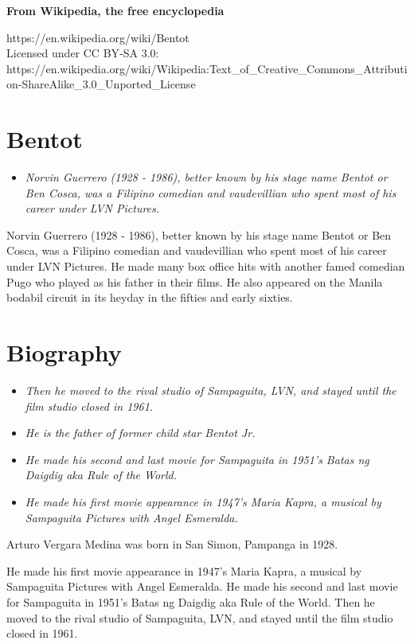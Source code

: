 \textbf{From Wikipedia, the free encyclopedia}

https://en.wikipedia.org/wiki/Bentot\\
Licensed under CC BY-SA 3.0:\\
https://en.wikipedia.org/wiki/Wikipedia:Text\_of\_Creative\_Commons\_Attribution-ShareAlike\_3.0\_Unported\_License

\section{Bentot}\label{bentot}

\begin{itemize}
\item
  \emph{Norvin Guerrero (1928 - 1986), better known by his stage name
  Bentot or Ben Cosca, was a Filipino comedian and vaudevillian who
  spent most of his career under LVN Pictures.}
\end{itemize}

Norvin Guerrero (1928 - 1986), better known by his stage name Bentot or
Ben Cosca, was a Filipino comedian and vaudevillian who spent most of
his career under LVN Pictures. He made many box office hits with another
famed comedian Pugo who played as his father in their films. He also
appeared on the Manila bodabil circuit in its heyday in the fifties and
early sixties.

\section{Biography}\label{biography}

\begin{itemize}
\item
  \emph{Then he moved to the rival studio of Sampaguita, LVN, and stayed
  until the film studio closed in 1961.}
\item
  \emph{He is the father of former child star Bentot Jr.}
\item
  \emph{He made his second and last movie for Sampaguita in 1951's Batas
  ng Daigdig aka Rule of the World.}
\item
  \emph{He made his first movie appearance in 1947's Maria Kapra, a
  musical by Sampaguita Pictures with Angel Esmeralda.}
\end{itemize}

Arturo Vergara Medina was born in San Simon, Pampanga in 1928.

He made his first movie appearance in 1947's Maria Kapra, a musical by
Sampaguita Pictures with Angel Esmeralda. He made his second and last
movie for Sampaguita in 1951's Batas ng Daigdig aka Rule of the World.
Then he moved to the rival studio of Sampaguita, LVN, and stayed until
the film studio closed in 1961.


